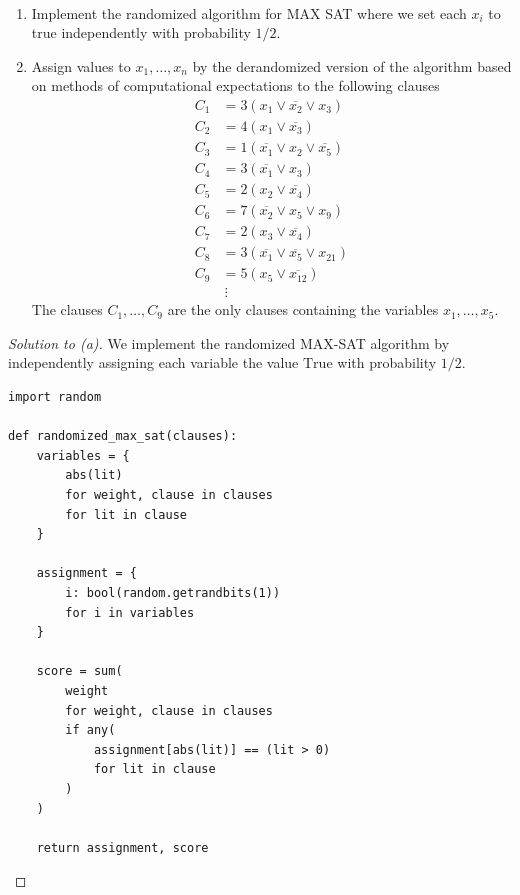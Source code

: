 \documentclass[11pt]{article}
\begin{document}
\begin{prob*}[4, Problem 2]
    \medskip 
    \
    
    \begin{enumerate}[label=\alph*)]
        \item Implement the randomized algorithm 
            for MAX SAT where we set each 
            $x_i$ to true independently with probability 
            $1/2$. 
        \item Assign values to $x_1,\ldots,x_n$ by 
            the derandomized version of the 
            algorithm based on methods of computational 
            expectations to the following clauses 
            \[
                \begin{aligned}
                C_1 &= 3(x_1 \lor \overline{x_2} \lor x_3) \\ 
                C_2 &= 4(x_1 \lor \overline{x_3} ) \\ 
                C_3 &= 1(\overline{x_1} \lor x_2 \lor \overline{x_5}) \\ 
                C_4 &= 3(\overline{x_1} \lor x_3) \\ 
                C_5 &= 2(x_2 \lor \overline{x_4}) \\ 
                C_6 &= 7(\overline{x_2} \lor x_5 \lor x_9) \\ 
                C_7 &= 2(x_3 \lor \overline{x_4}) \\ 
                C_8 &= 3(\overline{x_1} \lor \overline{x_5} \lor x_{21}) \\ 
                C_9 &= 5(x_5 \lor \overline{x_{12}}) \\ 
                & \ \vdots 
                \end{aligned}
            \]
            The clauses $C_1,\ldots,C_9$ are the only clauses containing 
            the variables $x_1,\ldots,x_5$.
    \end{enumerate}
\end{prob*}




\begin{proof}[Solution to (a)]
    We implement the randomized MAX-SAT algorithm by
    independently assigning each variable the value
    $\mathrm{True}$ with probability $1/2$.

    \begin{verbatim}
import random

def randomized_max_sat(clauses):
    variables = {
        abs(lit)
        for weight, clause in clauses
        for lit in clause
    }

    assignment = {
        i: bool(random.getrandbits(1))
        for i in variables
    }

    score = sum(
        weight
        for weight, clause in clauses
        if any(
            assignment[abs(lit)] == (lit > 0)
            for lit in clause
        )
    )

    return assignment, score
    \end{verbatim}
\end{proof}
\end{document}

